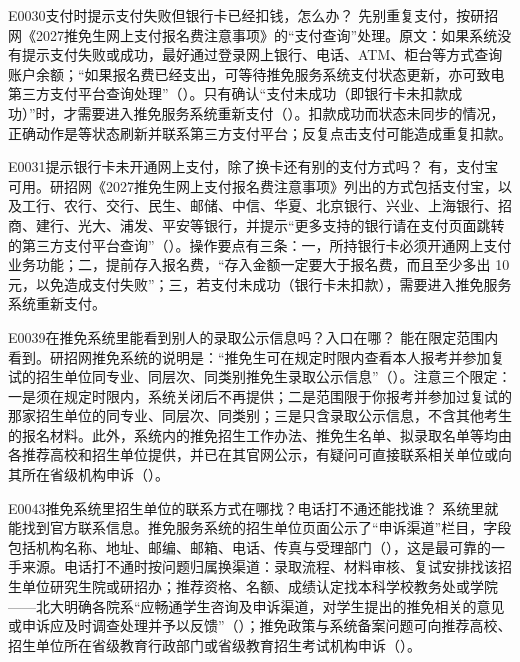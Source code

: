 \begin{qa}{E0030}{支付时提示支付失败但银行卡已经扣钱，怎么办？}
先别重复支付，按研招网《2027推免生网上支付报名费注意事项》的“支付查询”处理。原文：如果系统没有提示支付失败或成功，最好通过登录网上银行、电话、ATM、柜台等方式查询账户余额；“如果报名费已经支出，可等待推免服务系统支付状态更新，亦可致电第三方支付平台查询处理”（）。只有确认“支付未成功（即银行卡未扣款成功）”时，才需要进入推免服务系统重新支付（）。扣款成功而状态未同步的情况，正确动作是等状态刷新并联系第三方支付平台；反复点击支付可能造成重复扣款。
\end{qa}

\begin{qa}{E0031}{提示银行卡未开通网上支付，除了换卡还有别的支付方式吗？}
有，支付宝可用。研招网《2027推免生网上支付报名费注意事项》列出的方式包括支付宝，以及工行、农行、交行、民生、邮储、中信、华夏、北京银行、兴业、上海银行、招商、建行、光大、浦发、平安等银行，并提示“更多支持的银行请在支付页面跳转的第三方支付平台查询”（）。操作要点有三条：一，所持银行卡必须开通网上支付业务功能；二，提前存入报名费，“存入金额一定要大于报名费，而且至少多出 10 元，以免造成支付失败”；三，若支付未成功（银行卡未扣款），需要进入推免服务系统重新支付。
\end{qa}

\begin{qa}{E0039}{在推免系统里能看到别人的录取公示信息吗？入口在哪？}
能在限定范围内看到。研招网推免系统的说明是：“推免生可在规定时限内查看本人报考并参加复试的招生单位同专业、同层次、同类别推免生录取公示信息”（）。注意三个限定：一是须在规定时限内，系统关闭后不再提供；二是范围限于你报考并参加过复试的那家招生单位的同专业、同层次、同类别；三是只含录取公示信息，不含其他考生的报名材料。此外，系统内的推免招生工作办法、推免生名单、拟录取名单等均由各推荐高校和招生单位提供，并已在其官网公示，有疑问可直接联系相关单位或向其所在省级机构申诉（）。
\end{qa}

\begin{qa}{E0043}{推免系统里招生单位的联系方式在哪找？电话打不通还能找谁？}
系统里就能找到官方联系信息。推免服务系统的招生单位页面公示了“申诉渠道”栏目，字段包括机构名称、地址、邮编、邮箱、电话、传真与受理部门（），这是最可靠的一手来源。电话打不通时按问题归属换渠道：录取流程、材料审核、复试安排找该招生单位研究生院或研招办；推荐资格、名额、成绩认定找本科学校教务处或学院——北大明确各院系“应畅通学生咨询及申诉渠道，对学生提出的推免相关的意见或申诉应及时调查处理并予以反馈”（）；推免政策与系统备案问题可向推荐高校、招生单位所在省级教育行政部门或省级教育招生考试机构申诉（）。
\end{qa}

